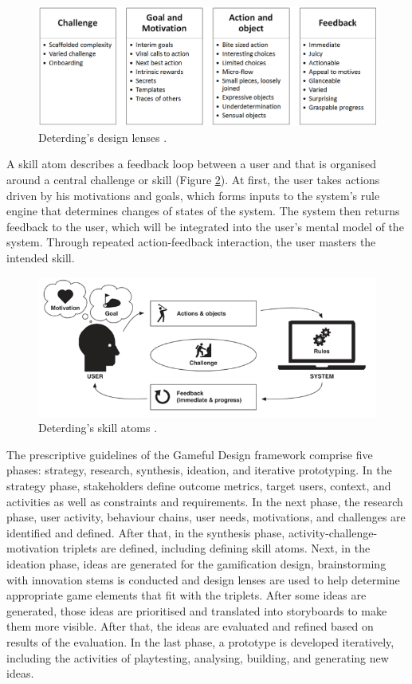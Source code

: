 \documentclass[12pt, a4paper]{report}
\begin{document}
{\begin{figure}[ht]
\centering
\includegraphics[width=14cm]{lenses}
\caption{Deterding's design lenses \cite{deterding2015lens}.}
\label{lenses}
\end{figure}

A skill atom describes a feedback loop between a user and that is organised around a central challenge or skill (Figure \ref{skill-atoms}). At first, the user takes actions driven by his motivations and goals, which forms inputs to the system's rule engine that determines changes of states of the system. The system then returns feedback to the user, which will be integrated into the user's mental model of the system. Through repeated action-feedback interaction, the user masters the intended skill.

\begin{figure}[ht]
\centering
\includegraphics[width=14cm]{skill-atoms}
\caption{Deterding's skill atoms \cite{deterding2015lens}.}
\label{skill-atoms}
\end{figure}

The prescriptive guidelines of the Gameful Design framework comprise five phases: strategy, research, synthesis, ideation, and iterative prototyping. In the strategy phase, stakeholders define outcome metrics, target users, context, and activities as well as constraints and requirements. In the next phase, the research phase, user activity, behaviour chains, user needs, motivations, and challenges are identified and defined. After that, in the synthesis phase, activity-challenge-motivation triplets are defined, including defining skill atoms. Next, in the ideation phase, ideas are generated for the gamification design, brainstorming with innovation stems is conducted and design lenses are used to help determine appropriate game elements that fit with the triplets. After some ideas are generated, those ideas are prioritised and translated into storyboards to make them more visible. After that, the ideas are evaluated and refined based on results of the evaluation. In the last phase, a prototype is developed iteratively, including the activities of playtesting, analysing, building, and generating new ideas. 

}
\end{document}

